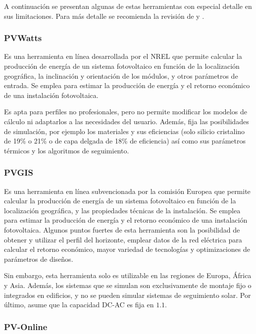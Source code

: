 A continuación se presentan algunas de estas herramientas con especial detalle en sus limitaciones. Para más detalle se recomienda la revisión de \cite{stein_models_2009} y \cite{Kumar_2017}.

\subsubsection{PVWatts}

Es una herramienta en línea desarrollada por el \gls{NREL} que permite calcular la producción de energía de un sistema fotovoltaico en función de la localización geográfica, la inclinación y orientación de los módulos, y otros parámetros de entrada. Se emplea para estimar la producción de energía y el retorno económico de una instalación fotovoltaica.

Es apta para perfiles no profesionales, pero no permite modificar los modelos de cálculo ni adaptarlos a las necesidades del usuario. Además, fija las posibilidades de simulación, por ejemplo los materiales y sus eficiencias (solo silicio cristalino de 19\% o 21\% o de capa delgada de 18\% de eficiencia) así como sus parámetros térmicos y los algoritmos de seguimiento.

\subsubsection{PVGIS}

Es una herramienta en línea subvencionada por la comisión Europea que permite calcular la producción de energía de un sistema fotovoltaico en función de la localización geográfica, y las propiedades técnicas de la instalación. Se emplea para estimar la producción de energía y el retorno económico de una instalación fotovoltaica. Algunos puntos fuertes de esta herramienta son la posibilidad de obtener y utilizar el perfil del horizonte, emplear datos de la red eléctrica para calcular el retorno económico, mayor variedad de tecnologías y optimizaciones de parámetros de diseños.

Sin embargo, esta herramienta solo es utilizable en las regiones de Europa, África y Asia. Además, los sistemas que se simulan son exclusivamente de montaje fijo o integrados en edificios, y no se pueden simular sistemas de seguimiento solar. Por último, asume que la \gls{capacidad DC-AC} es fija en $1.1$.

\subsubsection{PV-Online}

